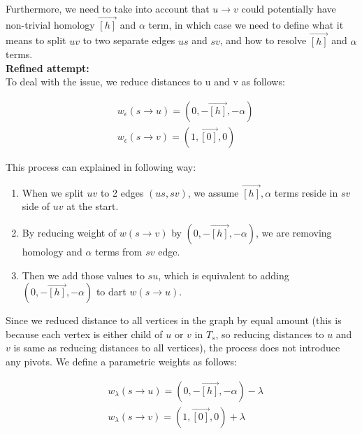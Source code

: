 \documentclass{article}
\begin{document}

Furthermore, we need to take into account that $u \rightarrow v$ could potentially have non-trivial homology $\vec{[h]}$ and $\alpha$ term, in which case we need to define what it means to split $uv$ to two separate edges $us$ and $sv$, and how to resolve $\vec{[h]}$ and $\alpha$ terms. \\

\textbf{Refined attempt:} \\
To deal with the issue, we reduce distances to u and v as follows:

\begin{align}
& w_{\epsilon}(s \rightarrow u) = ( 0, -\vec{[h]}, -\alpha ) \\ 
& w_{\epsilon}(s \rightarrow v) = ( 1, \vec{[0]}, 0 )
\end{align}

This process can explained in following way: 
\begin{enumerate}
\item When we split $uv$ to 2 edges $(us, sv)$, we assume $\vec{[h]}, \alpha$ terms reside in $sv$ side of $uv$ at the start.
\item By reducing weight of $w(s \rightarrow v) $ by $( 0, -\vec{[h]}, -\alpha )$, we are removing homology and $\alpha$ terms from $sv$ edge.
\item Then we add those values to $su$, which is equivalent to adding  $( 0, -\vec{[h]}, -\alpha )$ to dart $w(s \rightarrow u) $.
\end{enumerate}

Since we reduced distance to all vertices in the graph by equal amount (this is because each vertex is either child of $u$ or $v$ in $T_s$, so reducing distances to $u$ and $v$ is same as reducing distances to all vertices), the process does
not introduce any pivots. We define a parametric weights as follows:

\begin{align}
& w_{\lambda}(s \rightarrow u) = ( 0, -\vec{[h]}, -\alpha ) - \lambda \\
& w_{\lambda}(s \rightarrow v) = ( 1, \vec{[0]}, 0 )  + \lambda 
\end{align}
\end{document}
